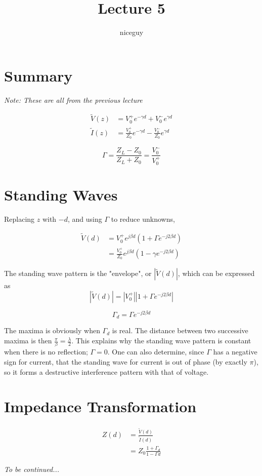 \documentclass[12pt]{article}
\title{Lecture 5}
\author{niceguy}
\begin{document}
\maketitle

\section{Summary}

\textit{Note: These are all from the previous lecture}

\begin{align*}
    \tilde V(z) &= V_0^+ e^{-\gamma d} + V_0^-e^{\gamma d} \\
    \tilde I(z) &= \frac{V_0^+}{Z_0} e^{-\gamma d} - \frac{V_0^-}{Z_0} e^{\gamma d}
\end{align*}

$$\Gamma = \frac{Z_L - Z_0}{Z_L + Z_0} = \frac{V_0^-}{V_0^+}$$

\section{Standing Waves}

Replacing $z$ with $-d$, and using $\Gamma$ to reduce unknowns,

\begin{align*}
    \tilde V(d) &= V_0^+e^{j\beta d} \left(1 + \Gamma e^{-j2\beta d}\right) \\
                &= \frac{V_0^+}{Z_0} e^{j\beta d} \left(1 - \gamma e^{-j2\beta d}\right)
\end{align*}

The standing wave pattern is the "envelope", or $|\tilde V(d)|$, which can be expressed as
$$|\tilde V(d)| = |V_0^+||1 + \Gamma e^{-j2\beta d}|$$

\begin{defn}
    $$\Gamma_d = \Gamma e^{-j2\beta d}$$
\end{defn}

The maxima is obviously when $\Gamma_d$ is real. The distance between two successive maxima is then $\frac{\pi}{\beta} = \frac{\lambda}{2}$. This explains why the standing wave pattern is constant when there is no reflection; $\Gamma = 0$. One can also determine, since $\Gamma$ has a negative sign for current, that the standing wave for current is out of phase (by exactly $\pi$), so it forms a destructive interference pattern with that of voltage.

\section{Impedance Transformation}

\begin{align*}
    Z(d) &= \frac{\tilde V(d)}{\tilde I(d)} \\
         &= Z_0 \frac{1 + \Gamma_d}{1 - \Gamma d}
\end{align*}

\textit{To be continued...}
\end{document}
